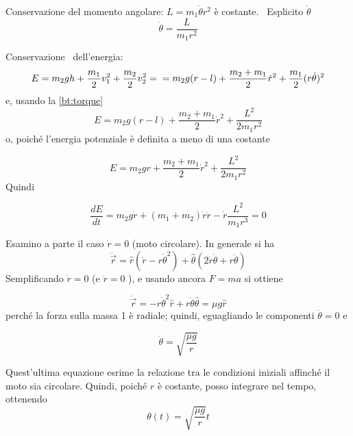 \documentclass[../main.tex]{subfiles}
\begin{document}
Conservazione del momento angolare:
$L=m_1\dot \theta r^2$ \`e costante. \ Esplicito $ \dot \theta $
\begin{equation}
  \label{bt:torque}
  \dot \theta =\frac L{m_1r^2}
\end{equation}

Conservazione \ dell'energia:
\begin{equation}
  E
  =m_2 g h +      \frac{m_1}{2} v_1^2 +\frac{m_2}{2} v_2^2= \\
  =m_2 g (r-l)+   \frac{m_2+m_1}{2} \dot r^2+ \frac{m_1}{2} (r\dot\theta)^2
\end{equation}
e, usando la \cref{bt:torque}
\begin{equation}
  E=m_2 g (r-l)+   \frac{m_2+m_1}{2} \dot r^2+ \frac{L^2}{2 m_1 r^2}
\end{equation}
o, poich\'e l'energia
potenziale \`e definita a meno di una costante

\begin{equation}
  \label{bt:energy}
  E=m_2gr+\frac{m_2+m_1} 2\dot r^2+\frac{L^2}{2m_1r^2}
\end{equation}
Quindi

\begin{equation}
  \label{bt:denergy}
  \frac{dE}{dt}=m_2 g \dot r+(m_1+m_2) \dot r \ddot r - \dot r \frac{L^2}{m_1r^3}=0
\end{equation}

Esamino a parte il caso  $\dot r=0$ (moto circolare). In generale si ha
\begin{equation}
  \ddot{\vec r}=\hat r(\ddot r- r \dot \theta^2)+ \hat \theta ( 2 \dot r \dot \theta +r \ddot \theta)
\end{equation}
Semplificando  $\dot r=0$ (e $\ddot r=0$ ), e usando ancora $F=ma$ si ottiene 

\begin{equation}
  \ddot{ \vec r }= -r \dot \theta ^2 \hat r + r \ddot \theta \hat \theta =\mu g \hat r
\end{equation}
perch\'e la forza sulla massa 1 \`e radiale; quindi, eguagliando le componenti $\ddot \theta =0$ e

\begin{equation}
  \dot{\theta }=\sqrt{\frac{\mu g} r}
\end{equation}

Quest'ultima equazione esrime la relazione tra le condizioni iniziali affinch\'e il moto sia circolare. Quindi, poich\'e 
$r$ \`e costante, posso integrare nel tempo, ottenendo 
\begin{equation}
\theta(t)=\sqrt{\frac{\mu g}{r}}t
\end{equation}
\end{document}
